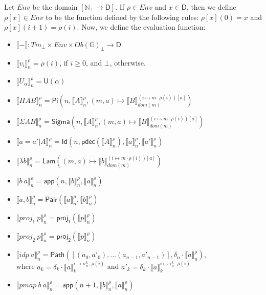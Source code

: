 \documentclass{amsart}
\theoremstyle{definition}
\theoremstyle{remark}
\newcommand{\D}{\mathsf{D}}
\newcommand{\bbG}{\mathbb{G}}
\newcommand{\nats}{\mathbb{N}}
\numberwithin{table}{section}
\begin{document}
Let $Env$ be the domain $[\nats_\bot \to \D]$.
If $\rho \in Env$ and $x \in \D$, then we define $\rho[x] \in Env$ to be the function defined by the following rules: $\rho[x](0) = x$ and $\rho[x](i+1) = \rho(i)$.
Now, we define the evaluation function:
\begin{itemize}
\item[] $\llbracket - \rrbracket : Tm_\bot \times Env \times Ob(\bbG)_\bot \to \D$
\item[] $\llbracket v_i \rrbracket^\rho_n = \rho(i)$, if $i \geq 0$, and $\bot$, otherwise.
\item[] $\llbracket U_\alpha \rrbracket^\rho_n = \mathsf{U}(\alpha)$
\item[] $\llbracket \Pi A B \rrbracket^\rho_n = \mathsf{Pi}(n, \llbracket A \rrbracket^\rho_n, (m, a) \mapsto \llbracket B \rrbracket^{(i \mapsto m \cdot \rho(i))[a]}_{dom(m)})$
\item[] $\llbracket \Sigma A B \rrbracket^\rho_n = \mathsf{Sigma}(n, \llbracket A \rrbracket^\rho_n, (m, a) \mapsto \llbracket B \rrbracket^{(i \mapsto m \cdot \rho(i))[a]}_{dom(m)})$
\item[] $\llbracket a = a' | A \rrbracket^\rho_n = \mathsf{Id}(n, \mathsf{pdec}(\llbracket A \rrbracket^\rho_n), \llbracket a \rrbracket^\rho_n, \llbracket a' \rrbracket^\rho_n)$
\item[] $\llbracket \lambda b \rrbracket^\rho_n = \mathsf{Lam}((m, a) \mapsto \llbracket b \rrbracket^{(i \mapsto m \cdot \rho(i))[a]}_{dom(m)})$
\item[] $\llbracket b\ a \rrbracket^\rho_n = \mathsf{app}(n, \llbracket b \rrbracket^\rho_n, \llbracket a \rrbracket^\rho_n)$
\item[] $\llbracket a, b \rrbracket^\rho_n = \mathsf{Pair}(\llbracket a \rrbracket^\rho_n, \llbracket b \rrbracket^\rho_n)$
\item[] $\llbracket proj_1\ p \rrbracket^\rho_n = \mathsf{proj_1}(\llbracket p \rrbracket^\rho_n)$
\item[] $\llbracket proj_2\ p \rrbracket^\rho_n = \mathsf{proj_2}(\llbracket p \rrbracket^\rho_n)$
\item[] $\llbracket idp\ a \rrbracket^\rho_n = \mathsf{Path}([(a_0, a'_0), \ldots (a_{n-1}, a'_{n-1})], \delta_n \cdot \llbracket a \rrbracket^\rho_n)$, \\
    \indent where $a_k  = \delta_k \cdot \llbracket a \rrbracket^{i \mapsto \sigma^k_n \cdot \rho(i)}_k$ and
                  $a'_k = \delta_k \cdot \llbracket a \rrbracket^{i \mapsto \tau^k_n \cdot \rho(i)}_k$
\item[] $\llbracket pmap\ b\ a \rrbracket^\rho_n = \mathsf{app}(n + 1, \llbracket b \rrbracket^\rho_n, \llbracket a \rrbracket^\rho_n)$
\end{itemize}
\end{document}
